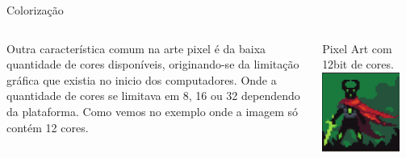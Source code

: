 \documentclass[compress,12pt]{beamer}
\begin{document}
\begin{frame}{Colorização}
	\begin{columns}
		\begin{column}{0.5\textwidth}
			        
			{Outra característica comum na arte pixel é da baixa quantidade de cores disponíveis, originando-se da limitação gráfica que existia no inicio dos computadores. Onde a quantidade de cores se limitava em 8, 16 ou 32 dependendo da plataforma.}
            \vfill      
			{Como vemos no exemplo onde a imagem só contém 12 cores.}
			        
		\end{column}
		\begin{column}{0.5\textwidth}  %
			\begin{center}
                {Pixel Art com 12bit de cores.} 
				\includegraphics[width=0.85\textwidth]{Images/12bitImage.png}
			\end{center}
		\end{column}
	\end{columns}
\end{frame}
\end{document}
